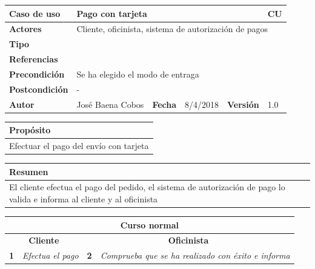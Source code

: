 \documentclass[12pt,spanish]{article}
\begin{document}
\begin{table}[H]
	\centering
	\begin{tabular}{|m{3cm}|m{4cm}|m{2cm}|m{2cm}|m{2cm}|m{1cm}|}
		\hline
		\textbf{Caso de uso} &  \multicolumn{4}{m{11cm}|}{Pago con tarjeta} \vline &  \cellcolor{gray!40}CU\arabic{contadorCU}  \stepcounter{contadorCU} \\
		\hline
		\textbf{Actores} & \multicolumn{5}{m{11cm}|}{Cliente, oficinista, sistema de autorización de pagos} \\
		\hline
		\textbf{Tipo} & \multicolumn{5}{m{11cm}|}{} \\
		\hline
		\textbf{Referencias} &\multicolumn{5}{m{11cm}|}{} \\
		\hline
		\textbf{Precondición} & \multicolumn{5}{m{11cm}|}{Se ha elegido el modo de entraga} \\
		\hline
		\textbf{Postcondición} & \multicolumn{5}{m{11cm}|}{-} \\
		\hline
		\textbf{Autor} & José Baena Cobos & \textbf{Fecha} & 8/4/2018 & \textbf{Versión} & 1.0 \\
		\hline
	\end{tabular}
	
	\vspace{1cm}
	
	\begin{tabular}{|m{16.2cm}|}
		\hline
		\textbf{Propósito} \\
		\hline
		Efectuar el pago del envío con tarjeta\\
		\hline
	\end{tabular}
	
	\vspace{1cm}
	
	\begin{tabular}{|m{16.2cm}|}
		\hline
		\textbf{Resumen} \\
		\hline
		El cliente efectua el pago del pedido, el sistema de autorización de pago lo valida e informa al cliente y al oficinista\\
		\hline
	\end{tabular}
	
	\vspace{1cm}
	
	\begin{tabular}{|m{5pt}|m{7.33cm}|m{5pt}|m{7.33cm}|}
		\hline
		\multicolumn{4}{|c|}{\textbf{Curso normal}} \\
		\hline
		\multicolumn{2}{|c}{\textbf{Cliente}} & \multicolumn{2}{|c|}{\textbf{Oficinista}} \\
		\hline
		\textbf{1} & \textit{Efectua el pago} & \textbf{2} & \textit{Comprueba que se ha realizado con éxito e informa} \\
		\hline
	

\end{tabular}
\end{table}
\end{document}
